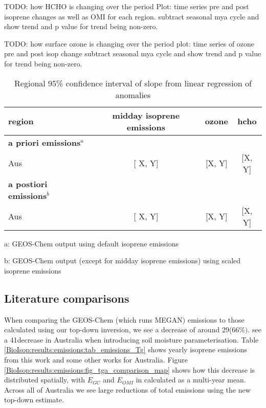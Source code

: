     
    TODO: how HCHO is changing over the period
    Plot: time series pre and post isoprene changes as well as OMI for each region.
    subtract seasonal mya cycle and show trend and p value for trend being non-zero.
    
    TODO: how surface ozone is changing over the period
    plot: time series of ozone pre and post isop change
    subtract seasonal mya cycle and show trend and p value for trend being non-zero.
    
    \begin{table}\begin{threeparttable}
      \caption{Regional 95\% confidence interval of slope from linear regression of anomalies}
      \begin{tabular}{ l  c  c  c} 
        \toprule
        region & midday isoprene emissions & ozone & hcho \\
        \midrule
        \textbf{a priori emissions}$^a$ & & & \\
        Aus & [ X, Y] & [X, Y] & [X, Y] \\ 
        \midrule
        \textbf{a postiori emissions}$^b$ & & & \\
        Aus & [ X, Y] & [X, Y] & [X, Y] \\ 
        \bottomrule
      \end{tabular}
      \begin{tablenotes} 
        \item a: GEOS-Chem output using default isoprene emissions
        \item b: GEOS-Chem output (except for midday isoprene emissions) using scaled isoprene emissions
      \end{tablenotes}
    \end{threeparttable}\end{table}
    
  \subsection{Literature comparisons}
    
    When comparing the GEOS-Chem (which runs MEGAN) emissions to those calculated using our top-down inversion, we see a decrease of around 29\tgpyr ($66\%)$.
    \textcite{Sindelarova2014} see a 41\tgpyr decrease in Australia when introducing soil moisture parameterisation.
    Table \ref{BioIsop:results:emissions:tab_emissions_Tg} shows yearly isoprene emissions from this work and some other works for Australia.
    Figure \ref{BioIsop:results:emissions:fig_tga_comparison_map} shows how this decrease is distributed spatially, with $E_{GC}$ and $E_{OMI}$ in \tgpyr calculated as a multi-year mean.
    Across all of Australia we see large reductions of total emissions using the new top-down estimate.
    
